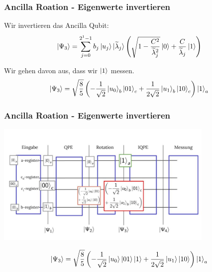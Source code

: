 \begin{frame}
    \frametitle{Ancilla Roation - Eigenwerte invertieren}
    Wir invertieren das Ancilla Qubit:
    $$ \ket{\Psi_3} = \sum_{j=0}^{2^{1}-1} b_j \ket{u_j} \ket{\widetilde{\lambda}_j} \left(\sqrt{1-\frac{C^2}{\widetilde{\lambda}_j^2}}\ket{0} + \frac{C}{\widetilde{\lambda}_j} \ket{1}\right)$$


    \hfil

    Wir gehen davon aus, dass wir $\ket{1}$ messen.
    $$  \ket{\Psi_3} =\sqrt{\frac{8}{5}}\left(-\frac{1}{\sqrt{2}} \ket{u_0}_b\ket{01}_c +\frac{1}{2\sqrt{2}} \ket{u_1}_b\ket{10}_c\right)\ket{1}_a $$
\end{frame}

\begin{frame}
    \frametitle{Ancilla Roation - Eigenwerte invertieren}
    \begin{center}

    \includegraphics[width=10.5cm]{img/example_circuit/example_circuit_3.jpg}
    \end{center}
    $$ \ket{\Psi_3} =\sqrt{\frac{8}{5}}\left(-\frac{1}{\sqrt{2}} \ket{u_0}\ket{01}\ket{1} +\frac{1}{2\sqrt{2}} \ket{u_1} \ket{10}\right)\ket{1}_a$$
\end{frame}

